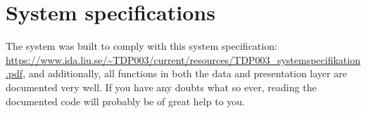 \documentclass{TDP003mall}
\begin{document}
\section{System specifications}\label{system-specs}
The system was built to comply with this system specification: \url{https://www.ida.liu.se/~TDP003/current/resources/TDP003_systemspecifikation.pdf}, and additionally, all functions in both the data and presentation layer are documented very well. If you have any doubts what so ever, reading the documented code will probably be of great help to you.
\end{document}
